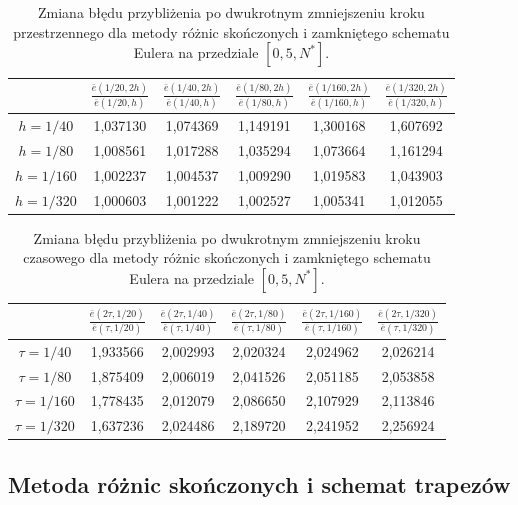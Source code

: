 \documentclass{article}
\begin{document}
		\begin{table}[h!]
			\caption{Zmiana błędu przybliżenia po dwukrotnym zmniejszeniu kroku przestrzennego dla metody różnic skończonych i zamkniętego schematu Eulera na przedziale $[0,5, N^{*}]$.}
			\centering
			\begin{tabular}{|c|c|c|c|c|c|}
				\hline
				& $\frac{\bar{e}(1/20,2h)}{\bar{e}(1/20,h)}$ &  $\frac{\bar{e}(1/40,2h)}{\bar{e}(1/40,h)}$ &  $\frac{\bar{e}(1/80,2h)}{\bar{e}(1/80,h)}$ &  $\frac{\bar{e}(1/160,2h)}{\bar{e}(1/160,h)}$ &  $\frac{\bar{e}(1/320,2h)}{\bar{e}(1/320,h)}$ \\
				\hline
				$h=1/40$  &  1,037130 &	1,074369 &	1,149191 &	1,300168 &	1,607692 \\
				\hline
				$h=1/80$  &1,008561 &	1,017288 &	1,035294 &	1,073664 &	1,161294 \\
				\hline
				$h=1/160$ &1,002237 &	1,004537 &	1,009290 &	1,019583 &	1,043903 \\
				\hline
				$h=1/320$ &1,000603 &	1,001222 &	1,002527 &	1,005341 &	1,012055 \\
				\hline
			\end{tabular}
		\end{table}
		\begin{table}[h!]
			\caption{Zmiana błędu przybliżenia po dwukrotnym zmniejszeniu kroku czasowego dla metody różnic skończonych i zamkniętego schematu Eulera na przedziale $[0,5, N^{*}]$.}
			\centering
			\begin{tabular}{|c|c|c|c|c|c|}
				\hline
				& $\frac{\bar{e}(2\tau,1/20)}{\bar{e}(\tau,1/20)}$ &  $\frac{\bar{e}(2\tau,1/40)}{\bar{e}(\tau,1/40)}$ &  $\frac{\bar{e}(2\tau,1/80)}{\bar{e}(\tau,1/80)}$ &  $\frac{\bar{e}(2\tau,1/160)}{\bar{e}(\tau,1/160)}$ &  $\frac{\bar{e}(2\tau,1/320)}{\bar{e}(\tau,1/320)}$ \\
				\hline
				$\tau=1/40$ & 1,933566 	&2,002993 &	2,020324 &	2,024962 &	2,026214 \\
				\hline
				$\tau=1/80$  &1,875409 &2,006019 &	2,041526 &	2,051185 &	2,053858 \\
				\hline
				$\tau=1/160$ & 1,778435 &	2,012079 &	2,086650 &	2,107929 &	2,113846 \\
				\hline
				$\tau=1/320$ & 1,637236 &	2,024486 &	2,189720 &	2,241952 &	2,256924 \\
				\hline
			\end{tabular}
		\end{table}
\newpage		
\subsection{Metoda różnic skończonych i schemat trapezów}
\end{document}
